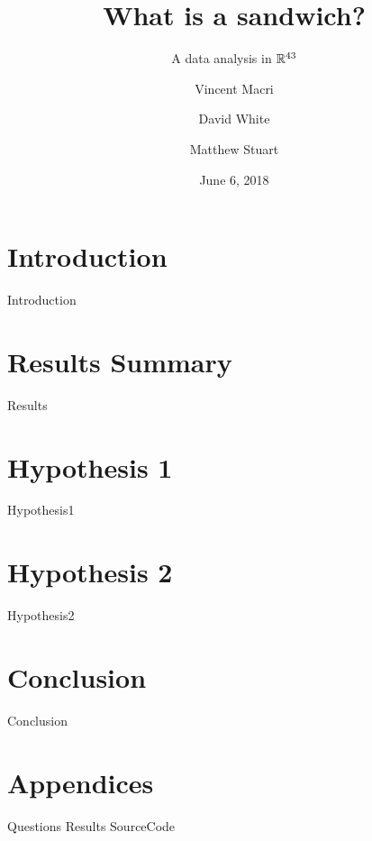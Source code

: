 

\title{What is a sandwich?}
\subtitle{A data analysis in $\mathbb{R}^{43}$}
\author{Vincent Macri \and David White \and Matthew Stuart}
\date{June 6, 2018}


	\maketitle
	
	\tableofcontents
	\clearpage
	\part{Introduction}\label{part:introduction}
		{Introduction}
	\part{Results Summary}\label{part:results}
		{Results}
	\part{Hypothesis 1}\label{part:hypothesis1}
		{Hypothesis1}
	\part{Hypothesis 2}\label{part:hypothesis2}
		{Hypothesis2}
	\part{Conclusion}\label{part:conclusion}
		{Conclusion}
	\appendix
	\part{Appendices}\label{part:appendix}
		{Questions}
		{Results}
		{SourceCode}
	\nocite{*}
	\printbibliography

